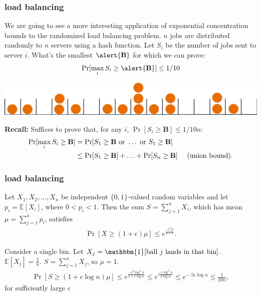 \documentclass[handout,compress]{beamer}
\newcommand{\E}{\mathbb{E}}
\begin{document}
\begin{frame}
	\frametitle{load balancing}
	\small
	We are going to see a more interesting application of exponential concentration bounds to the randomized load balancing problem. $n$ jobs are distributed randomly to $n$ servers using a hash function. Let $S_i$ be the number of jobs sent to server $i$.  What's the smallest $\alert{\mathbf{B}}$ for which we can prove:
	\begin{align*}
		\Pr[\max_i S_i \geq \alert{\mathbf{B}}] \leq 1/10
	\end{align*}
	\vspace{-1em}
	\begin{center}
		\includegraphics[width=.6\textwidth]{ballsinbins.png}
	\end{center}
	
	\textbf{Recall:} Suffices to prove that, for any $i$, $\Pr[ S_i \geq {\mathbf{B}}] \leq 1/10n$:
	\begin{align*}
		\Pr[\max_i S_i \geq {\mathbf{B}}] &= \Pr[S_1 \geq {\mathbf{B}} \text{ or } \ldots \text{ or } S_1 \geq {\mathbf{B}}] \\
		&\leq \Pr[S_1 \geq {\mathbf{B}}] + \ldots + \Pr[S_n \geq {\mathbf{B}}] \text{\hspace{1em} (union bound)}.
	\end{align*}
\end{frame}

\begin{frame}[t]
	\frametitle{load balancing}
	\begin{theorem}
		Let $X_1,X_2,\ldots,X_n$ be independent $\{0,1\}$-valued random variables and let
		$p_i = \E[X_i]$, where $0<p_i<1$.
		Then the sum $S = \sum_{j=1}^{n} X_i$, which has mean
		$\mu = \sum_{j=1}^{n} p_i$, satisfies
		\begin{align*}
			\Pr[X \geq (1+\epsilon)\mu] \leq e^{\frac{-\epsilon^2\mu}{2+ \epsilon}}.
		\end{align*}
	\end{theorem} 
	Consider a single bin. Let $X_j = \mathbbm{1}[\text{ball $j$ lands in that bin}]$. $\E[X_j] = \frac{1}{n}$. $S = \sum_{j=1}^n X_j$, so $\mu = 1$. 
	\begin{align*}
		\Pr[S \geq (1+c\log n)\mu] \leq e^{\frac{-c^2\log^2 n}{2 + c\log n}} \leq e^{\frac{-c\log^2 n}{2\log n}} \leq e^{-.5c\log n} \leq \frac{1}{10n},
	\end{align*}
	for sufficiently large $c$
	
\end{frame}
\end{document}
